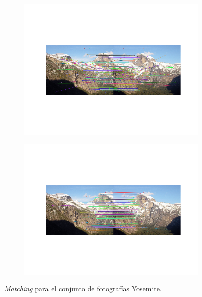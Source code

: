 \documentclass[11pt,a4paper]{article}
\begin{document}
\begin{figure}[H]
	\centering
	\begin{subfigure}[t]{\textwidth}
		\centering
		\includegraphics[scale=0.78]{img/yos-bf}
	\end{subfigure}
	\begin{subfigure}[t]{\textwidth}
		\centering
		\includegraphics[scale=0.78]{img/yos-lowe}
	\end{subfigure}
	\caption{\textit{Matching} para el conjunto de fotografías Yosemite.}
	\label{fig:yosemite}
\end{figure}
\end{document}
